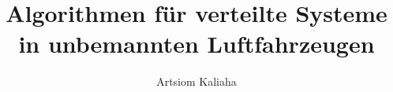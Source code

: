 \documentclass[bachelor,german,smartquotes]{hgbthesis}
\title{Algorithmen für verteilte Systeme in unbemannten Luftfahrzeugen}
\author{Artsiom Kaliaha}
\begin{document}

\frontmatter                    %

\maketitle
\tableofcontents

		
			

\mainmatter          %






\appendix                                            %


\MakeBibliography                        %

%

\end{document}
